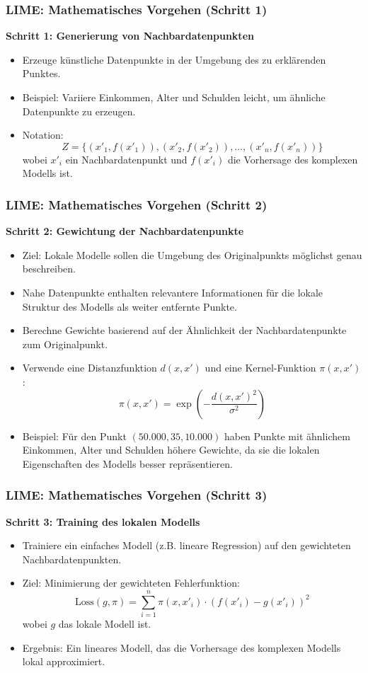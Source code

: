 \documentclass[aspectratio=1610, xcolor=dvipsnames, 9pt]{beamer}
\begin{document}
\begin{frame}
  \frametitle{LIME: Mathematisches Vorgehen (Schritt 1)}
  \textbf{Schritt 1: Generierung von Nachbardatenpunkten}
  \begin{itemize}
    \item Erzeuge künstliche Datenpunkte in der Umgebung des zu erklärenden Punktes.
    \item Beispiel: Variiere Einkommen, Alter und Schulden leicht, um ähnliche Datenpunkte zu erzeugen.
    \item Notation:
    \[
    Z = \{(x'_1, f(x'_1)), (x'_2, f(x'_2)), \dots, (x'_n, f(x'_n))\}
    \]
    wobei $x'_i$ ein Nachbardatenpunkt und $f(x'_i)$ die Vorhersage des komplexen Modells ist.
  \end{itemize}
\end{frame}

\begin{frame}
  \frametitle{LIME: Mathematisches Vorgehen (Schritt 2)}
  \textbf{Schritt 2: Gewichtung der Nachbardatenpunkte}
  \begin{itemize}
    \item Ziel: Lokale Modelle sollen die Umgebung des Originalpunkts möglichst genau beschreiben.
    \item Nahe Datenpunkte enthalten relevantere Informationen für die lokale Struktur des Modells als weiter entfernte Punkte.
    \item Berechne Gewichte basierend auf der Ähnlichkeit der Nachbardatenpunkte zum Originalpunkt.
    \item Verwende eine Distanzfunktion $d(x, x')$ und eine Kernel-Funktion $\pi(x, x')$:
    \[
    \pi(x, x') = \exp\left(-\frac{d(x, x')^2}{\sigma^2}\right)
    \]
    \item Beispiel: Für den Punkt $(50.000, 35, 10.000)$ haben Punkte mit ähnlichem Einkommen, Alter und Schulden höhere Gewichte, da sie die lokalen Eigenschaften des Modells besser repräsentieren.
  \end{itemize}
\end{frame}

\begin{frame}
  \frametitle{LIME: Mathematisches Vorgehen (Schritt 3)}
  \textbf{Schritt 3: Training des lokalen Modells}
  \begin{itemize}
    \item Trainiere ein einfaches Modell (z.B. lineare Regression) auf den gewichteten Nachbardatenpunkten.
    \item Ziel: Minimierung der gewichteten Fehlerfunktion:
    \[
    \text{Loss}(g, \pi) = \sum_{i=1}^n \pi(x, x'_i) \cdot \left(f(x'_i) - g(x'_i)\right)^2
    \]
    wobei $g$ das lokale Modell ist.
    \item Ergebnis: Ein lineares Modell, das die Vorhersage des komplexen Modells lokal approximiert.
  \end{itemize}
\end{frame}
\end{document}
